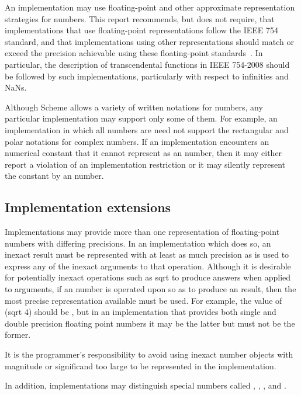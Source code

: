 \vest An implementation may use floating-point and other approximate
representation strategies for  numbers.
This report recommends, but does not require, that
implementations that use
floating-point representations
follow the IEEE 754 standard,
and that implementations using
other representations should match or exceed the precision achievable
using these floating-point standards~\cite{IEEE}.
In particular, the description of transcendental functions in IEEE 754-2008
should be followed by such implementations, particularly with respect
to infinities and NaNs.

Although Scheme allows a variety of written
notations for
numbers, any particular implementation may support only some of them.
For example, an implementation in which all numbers are 
need not support the rectangular and polar notations for complex
numbers.  If an implementation encounters an  numerical constant that
it cannot represent as an  number, then it may either report a
violation of an implementation restriction or it may silently represent the
constant by an  number.

\subsection{Implementation extensions}

\vest Implementations may provide more than one representation of
floating-point numbers with differing precisions.  In an implementation
which does so, an inexact result must be represented with at least
as much precision as is used to express any of the inexact arguments
to that operation.  Although it is desirable for potentially inexact
operations such as {\cf sqrt} to produce  answers when
applied to  arguments, if an  number is operated
upon so as to produce an  result, then the most precise
representation available must be used.  For example, the value of {\cf
(sqrt 4)} should be {}, but in an implementation that provides both
single and double precision floating point numbers it may be the latter
but must not be the former.

It is the programmer's responsibility to avoid using inexact
number objects with magnitude or significand too large to be
represented in the implementation.

In addition, implementations may
distinguish special numbers called ,
, , and .

